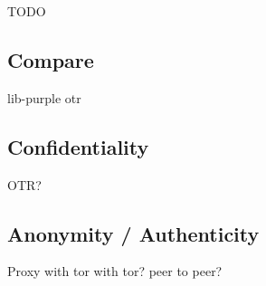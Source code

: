 
TODO

\subsection{Compare}
lib-purple otr

\subsection{Confidentiality}
OTR?

\subsection{Anonymity / Authenticity}
Proxy with tor
with tor?
peer to peer?
